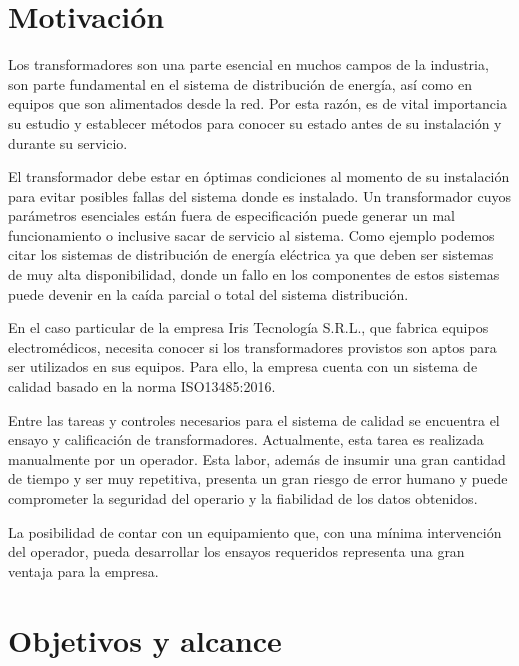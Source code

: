 
\section{Motivación}
Los transformadores son una parte esencial en muchos campos de la industria, son parte fundamental en el sistema de distribución de energía, así como en equipos que son alimentados desde la red. Por esta razón, es de vital importancia su estudio y establecer métodos para conocer su estado antes de su instalación y durante su servicio.

El transformador debe estar en óptimas condiciones al momento de su instalación para evitar posibles fallas del sistema donde es instalado. Un transformador cuyos parámetros esenciales están fuera de especificación puede generar un mal funcionamiento o inclusive sacar de servicio al sistema. Como ejemplo podemos citar los sistemas de distribución de energía eléctrica ya que deben ser sistemas de muy alta disponibilidad, donde un fallo en los componentes de estos sistemas puede devenir en la caída parcial o total del sistema distribución.

En el caso particular de la empresa Iris Tecnología S.R.L., que fabrica equipos electromédicos, necesita conocer si los transformadores provistos son aptos para ser utilizados en sus equipos. Para ello, la empresa cuenta con un sistema de calidad basado en la norma ISO13485:2016.

Entre las tareas y controles necesarios para el sistema de calidad se encuentra el ensayo y calificación de transformadores. Actualmente, esta tarea es realizada manualmente por un operador. Esta labor, además de insumir una gran cantidad de tiempo y ser muy repetitiva, presenta un gran riesgo de error humano y puede comprometer la seguridad del operario y la fiabilidad de los datos obtenidos.

La posibilidad de contar con un equipamiento que, con una mínima intervención del operador, pueda desarrollar los ensayos requeridos representa una gran ventaja para la empresa.


\section{Objetivos y alcance}

